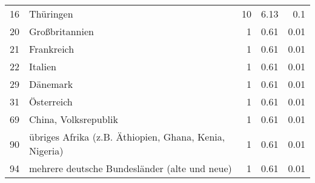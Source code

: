 \begin{longtable}{lXrrr}
        16 & \multicolumn{1}{X}{Thüringen} & %
          \num{10} &
          \num[round-mode=places,round-precision=2]{6,13} &
          \num[round-mode=places,round-precision=2]{0,1} \\

        20 & \multicolumn{1}{X}{Großbritannien} & %
          \num{1} &
          \num[round-mode=places,round-precision=2]{0,61} &
          \num[round-mode=places,round-precision=2]{0,01} \\

        21 & \multicolumn{1}{X}{Frankreich} & %
          \num{1} &
          \num[round-mode=places,round-precision=2]{0,61} &
          \num[round-mode=places,round-precision=2]{0,01} \\

        22 & \multicolumn{1}{X}{Italien} & %
          \num{1} &
          \num[round-mode=places,round-precision=2]{0,61} &
          \num[round-mode=places,round-precision=2]{0,01} \\

        29 & \multicolumn{1}{X}{Dänemark} & %
          \num{1} &
          \num[round-mode=places,round-precision=2]{0,61} &
          \num[round-mode=places,round-precision=2]{0,01} \\

        31 & \multicolumn{1}{X}{Österreich} & %
          \num{1} &
          \num[round-mode=places,round-precision=2]{0,61} &
          \num[round-mode=places,round-precision=2]{0,01} \\

        69 & \multicolumn{1}{X}{China, Volksrepublik} & %
          \num{1} &
          \num[round-mode=places,round-precision=2]{0,61} &
          \num[round-mode=places,round-precision=2]{0,01} \\

        90 & \multicolumn{1}{X}{übriges Afrika (z.B. Äthiopien, Ghana, Kenia, Nigeria)} & %
          \num{1} &
          \num[round-mode=places,round-precision=2]{0,61} &
          \num[round-mode=places,round-precision=2]{0,01} \\

        94 & \multicolumn{1}{X}{mehrere deutsche Bundesländer (alte und neue)} & %
          \num{1} &
          \num[round-mode=places,round-precision=2]{0,61} &
          \num[round-mode=places,round-precision=2]{0,01} \\


\end{longtable}
